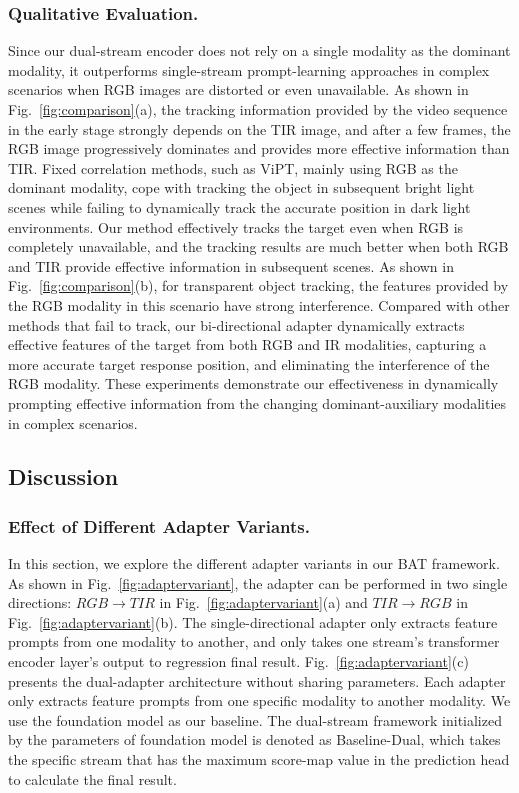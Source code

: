 \documentclass[letterpaper]{article} %
\begin{document}
\subsubsection{Qualitative Evaluation.}
Since our dual-stream encoder does not rely on a single modality as the dominant modality, it outperforms single-stream prompt-learning approaches in complex scenarios when RGB images are distorted or even unavailable.
As shown in Fig.~\ref{fig:comparison}(a), the tracking information provided by the video sequence in the early stage strongly depends on the TIR image, and after a few frames, the RGB image progressively dominates and provides more effective information than TIR. Fixed correlation methods, such as ViPT, mainly using RGB as the dominant modality, cope with tracking the object in subsequent bright light scenes while failing to dynamically track the accurate position in dark light environments. Our method effectively tracks the target even when RGB is completely unavailable, and the tracking results are much better when both RGB and TIR provide effective information in subsequent scenes.
As shown in Fig.~\ref{fig:comparison}(b), for transparent object tracking, the features provided by the RGB modality in this scenario have strong interference. Compared with other methods that fail to track, our bi-directional adapter dynamically extracts effective features of the target from both RGB and IR modalities, capturing a more accurate target response position, and eliminating the interference of the RGB modality.
These experiments demonstrate our effectiveness in dynamically prompting effective information from the changing dominant-auxiliary modalities in complex scenarios.







\subsection{Discussion}


\subsubsection{Effect of Different Adapter Variants.}

In this section, we explore the different adapter variants in our BAT framework. As shown in Fig.~\ref{fig:adaptervariant}, the adapter can be performed in two single directions: $RGB\rightarrow TIR$ in Fig.~\ref{fig:adaptervariant}(a) and $TIR\rightarrow RGB$ in Fig.~\ref{fig:adaptervariant}(b).
The single-directional adapter only extracts feature prompts from one modality to another, and only takes one stream's transformer encoder layer's output to regression final result.
Fig.~\ref{fig:adaptervariant}(c) presents the dual-adapter architecture without sharing parameters. Each adapter only extracts feature prompts from one specific modality to another modality.
We use the foundation model as our baseline. 
The dual-stream framework initialized by the parameters of foundation model is denoted as Baseline-Dual,
which takes the specific stream that has the maximum score-map value in the prediction head to calculate the final result. 
\end{document}
